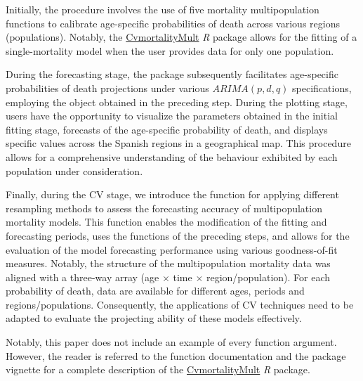 Initially, the procedure involves the use of five mortality multipopulation functions to calibrate age-specific probabilities of death across various regions (populations). Notably, the \href{https://cran.r-project.org/web/packages/CvmortalityMult/index.html}{CvmortalityMult} \emph{R} package allows for the fitting of a single-mortality model when the user provides data for only one population.

During the forecasting stage, the package subsequently facilitates age-specific probabilities of death projections under various $ARIMA (p,d,q)$ specifications, employing the object obtained in the preceding step. During the plotting stage, users have the opportunity to visualize the parameters obtained in the initial fitting stage, forecasts of the age-specific probability of death, and displays specific values across the Spanish regions in a geographical map. This procedure allows for a comprehensive understanding of the behaviour exhibited by each population under consideration.

Finally, during the CV stage, we introduce the function for applying different resampling methods to assess the forecasting accuracy of multipopulation mortality models. This function enables the modification of the fitting and forecasting periods, uses the functions of the preceding steps, and allows for the evaluation of the model forecasting performance using various goodness-of-fit measures. Notably, the structure of the multipopulation mortality data was aligned with a three-way array (age $\times$ time $\times$ region/population). For each probability of death, data are available for different ages, periods and regions/populations. Consequently, the applications of CV techniques need to be adapted to evaluate the projecting ability of these models effectively.

Notably, this paper does not include an example of every function argument. However, the reader is referred to the function documentation and the package vignette for a complete description of the \href{https://cran.r-project.org/web/packages/CvmortalityMult/index.html}{CvmortalityMult} \emph{R} package.


